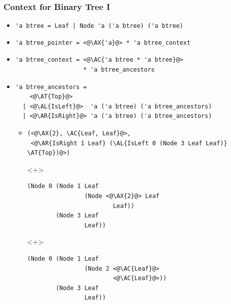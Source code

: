 \begin{frame}[fragile]
\frametitle{Context for Binary Tree I}

\newcommand{\AX}[1]{\textcolor{red}{#1}}
\newcommand{\AC}[1]{\textcolor{blue}{#1}}
\newcommand{\AL}[1]{\textcolor[RGB]{0,170,0}{#1}}
\newcommand{\AR}[1]{\textcolor{cyan}{#1}}
\newcommand{\AT}[1]{\textcolor{gray}{#1}}

\begin{itemize}
\item \lstinline.'a btree = Leaf | Node 'a ('a btree) ('a btree).

\item
\begin{lstlisting}
'a btree_pointer = <@\AX{'a}@> * 'a btree_context
\end{lstlisting}

\item
\begin{lstlisting}
'a btree_context = <@\AC{'a btree * 'a btree}@>
                   * 'a btree_ancestors
\end{lstlisting}

\item
\begin{lstlisting}
'a btree_ancestors =
    <@\AT{Top}@>
  | <@\AL{IsLeft}@>  'a ('a btree) ('a btree_ancestors)
  | <@\AR{IsRight}@> 'a ('a btree) ('a btree_ancestors)
\end{lstlisting}

\begin{itemize}
\item
\begin{lstlisting}
(<@\AX{2}, \AC{Leaf, Leaf}@>,
 <@\AR{IsRight 1 Leaf} (\AL{IsLeft 0 (Node 3 Leaf Leaf)} \AT{Top})@>)
\end{lstlisting}

\begin{onlyenv}<+>
\begin{lstlisting}
(Node 0 (Node 1 Leaf
                (Node <@\AX{2}@> Leaf
                        Leaf))
        (Node 3 Leaf
                Leaf))
\end{lstlisting}
\end{onlyenv}

\begin{onlyenv}<+>
\begin{lstlisting}
(Node 0 (Node 1 Leaf
                (Node 2 <@\AC{Leaf}@>
                        <@\AC{Leaf}@>))
        (Node 3 Leaf
                Leaf))
\end{lstlisting}
\end{onlyenv}


\end{itemize}
\end{itemize}
\end{frame}
